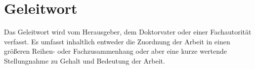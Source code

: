 \section*{Geleitwort}\label{sec:geleitwort}

Das Geleitwort wird vom Herausgeber, dem Doktorvater oder einer Fachautorität verfasst.
Es umfasst inhaltlich entweder die Zuordnung der Arbeit in einen größeren Reihen- oder Fachzusammenhang oder aber eine kurze wertende Stellungnahme zu Gehalt und Bedeutung der Arbeit.

\newpage